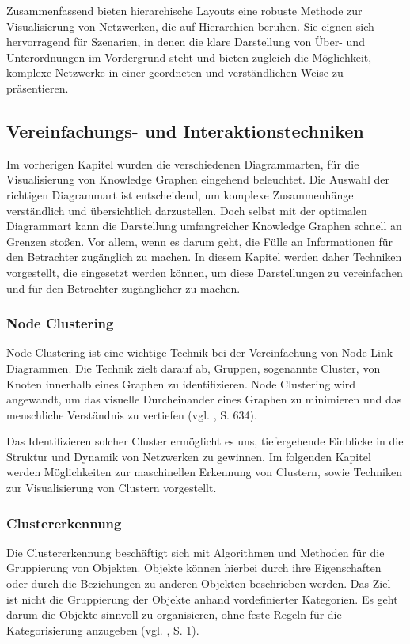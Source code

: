 Zusammenfassend bieten hierarchische Layouts eine robuste Methode zur Visualisierung von Netzwerken, die auf Hierarchien beruhen. Sie eignen sich hervorragend für Szenarien, in denen die klare Darstellung von Über- und Unterordnungen im Vordergrund steht und bieten zugleich die Möglichkeit, komplexe Netzwerke in einer geordneten und verständlichen Weise zu präsentieren.

\subsection{Vereinfachungs- und Interaktionstechniken}

Im vorherigen Kapitel wurden die verschiedenen Diagrammarten, für die Visualisierung von Knowledge Graphen eingehend beleuchtet. Die Auswahl der richtigen Diagrammart ist entscheidend, um komplexe Zusammenhänge verständlich und übersichtlich darzustellen. Doch selbst mit der optimalen Diagrammart kann die Darstellung umfangreicher Knowledge Graphen schnell an Grenzen stoßen. Vor allem, wenn es darum geht, die Fülle an Informationen für den Betrachter zugänglich zu machen. In diesem Kapitel werden daher Techniken vorgestellt, die eingesetzt werden können, um diese Darstellungen zu vereinfachen und für den Betrachter zugänglicher zu machen.

\subsubsection{Node Clustering}

Node Clustering ist eine wichtige Technik bei der Vereinfachung von Node-Link Diagrammen. Die Technik zielt darauf ab, Gruppen, sogenannte Cluster, von Knoten innerhalb eines Graphen zu identifizieren. Node Clustering wird angewandt, um das visuelle Durcheinander eines Graphen zu minimieren und das menschliche Verständnis zu vertiefen (vgl. \cite{chen:SurveyGraphVisualization}, S. 634).

Das Identifizieren solcher Cluster ermöglicht es uns, tiefergehende Einblicke in die Struktur und Dynamik von Netzwerken zu gewinnen. Im folgenden Kapitel werden Möglichkeiten zur maschinellen Erkennung von Clustern, sowie Techniken zur Visualisierung von Clustern vorgestellt.

\subsubsection{Clustererkennung}

Die Clustererkennung beschäftigt sich mit Algorithmen und Methoden für die Gruppierung von Objekten. Objekte können hierbei durch ihre Eigenschaften oder durch die Beziehungen zu anderen Objekten beschrieben werden. Das Ziel ist nicht die Gruppierung der Objekte anhand vordefinierter Kategorien. Es geht darum die Objekte sinnvoll zu organisieren, ohne feste Regeln für die Kategorisierung anzugeben (vgl. \cite{clustering:AlgosForClust}, S. 1). 

